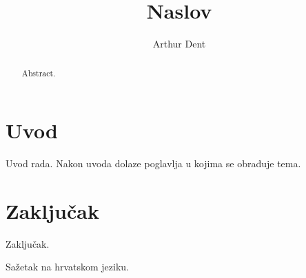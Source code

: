 \documentclass[times, utf8, zavrsni]{fer}
\begin{document}

\title{Naslov}

\author{Arthur Dent}

\maketitle

\izvornik

\zahvala{}

\tableofcontents

\chapter{Uvod}
Uvod rada. Nakon uvoda dolaze poglavlja u kojima se obrađuje tema.

\chapter{Zaključak}
Zaključak.




\begin{sazetak}
Sažetak na hrvatskom jeziku.

\end{sazetak}

\begin{abstract}
Abstract.

\end{abstract}
\end{document}
